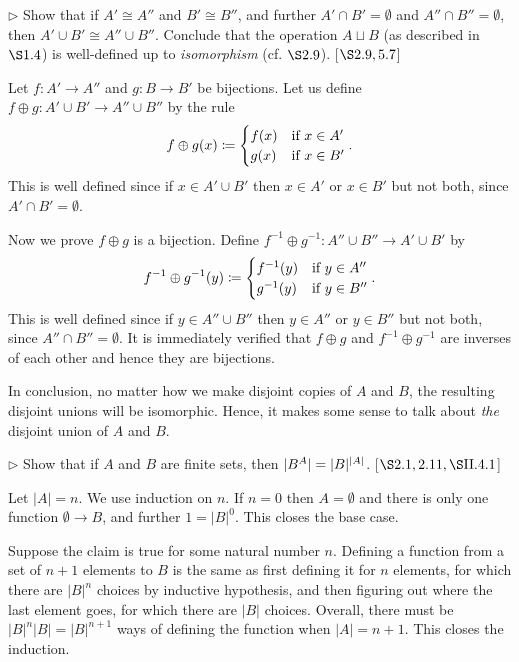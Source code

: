 \begin{exercise}
	\(\triangleright\) Show that if \(A' \cong A''\) and \(B' \cong B''\), and further \(A' \cap B' = \emptyset\) and \(A'' \cap B'' = \emptyset\), then \(A' \cup B' \cong A'' \cup B''\). Conclude that the operation \(A \sqcup B\) (as described in \(\S 1.4\)) is well-defined up to \textit{isomorphism} (cf. \(\S 2.9\)). [\(\S 2.9, 5.7\)]
\end{exercise}
\begin{solution}
	Let $f\colon A' \to A''$ and $g\colon B \to B'$ be bijections. Let us define $f\oplus g \colon A'\cup B' \to A''\cup B''$ by the rule
	\[
		f\oplus g(x) \coloneqq 
		\begin{cases}
			f(x) & \textnormal{if } x\in A'\\
			g(x) & \textnormal{if } x\in B'
		\end{cases}.
	\]
	This is well defined since if $x\in A'\cup B'$ then $x\in A'$ or $x\in B'$ but not both, since $A'\cap B' = \emptyset$.
	
	Now we prove $f\oplus g$ is a bijection. Define $f^{-1} \oplus g^{-1}\colon A''\cup B'' \to A' \cup B'$ by 
	\[
		f^{-1}\oplus g^{-1} (y)\coloneqq 
		\begin{cases}
			f^{-1}(y) & \textnormal{if } y \in A''\\
			g^{-1}(y) & \textnormal{if } y \in B''
		\end{cases}.
	\]
	This is well defined since if $y\in A''\cup B''$ then $y\in A''$ or $y\in B''$ but not both, since $A''\cap B'' = \emptyset$. It is immediately verified that $f\oplus g$ and $f^{-1}\oplus g^{-1}$ are inverses of each other and hence they are bijections.
	
	In conclusion, no matter how we make disjoint copies of $A$ and $B$, the resulting disjoint unions will be isomorphic. Hence, it makes some sense to talk about \emph{the} disjoint union of $A$ and $B$.
\end{solution}

\begin{exercise}
	\(\triangleright\) Show that if \(A\) and \(B\) are finite sets, then \(\lvert B^A\rvert = \lvert B\rvert^{\lvert A\rvert}\). [\(\S 2.1, 2.11, \S \RNo{2}.4.1\)]
\end{exercise}
\begin{solution}
	Let $|A| = n$. We use induction on $n$. If $n = 0$ then $A = \emptyset$ and there is only one function $\emptyset \to B$, and further $1 = |B|^0$. This closes the base case. 
	
	Suppose the claim is true for some natural number $n$. Defining a function from a set of $n+1$ elements to $B$ is the same as first defining it for $n$ elements, for which there are $|B|^n$ choices by inductive hypothesis, and then figuring out where the last element goes, for which there are $|B|$ choices. Overall, there must be $|B|^n|B| = |B|^{n+1}$ ways of defining the function when $|A| = n+1$. This closes the induction.
\end{solution}


